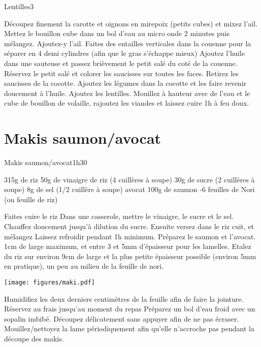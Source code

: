 {\begin{recette}{Lentilles}{3}{}{}
\begin{preparation}
\etape Découpez finement la carotte et oignons en mirepoix (petits cubes) et mixez l'ail.
\etape Mettez le bouillon cube dans un bol d'eau au micro onde 2 minutes puis mélangez. Ajoutez-y l'ail.
\etape Faites des entailles verticales dans la couenne pour la séparer en 4 demi cylindres (afin que le gras s'échappe mieux)
\etape Ajoutez l'huile dans une sauteuse et passez brièvement le petit salé du coté de la couenne.
\etape Réservez le petit salé et colorer les saucisses sur toutes les faces.
\etape Retirez les saucisses de la cocotte.
\etape Ajoutez les légumes dans la cocotte et les faire revenir doucement à l'huile.
\etape Ajoutez les lentilles. Mouillez à hauteur avec de l'eau et le cube de bouillon de volaille, rajoutez les viandes et 
laissez cuire 1h à feu doux.
\end{preparation}
\end{recette}

\section{Makis saumon/avocat}
\begin{recette}{Makis saumon/avocat}{}{1h30}{}
\begin{ingredients}
\ingredient 315g de riz %
\ingredient 50g de vinaigre de riz (4 cuillères à soupe)
\ingredient 30g de sucre (2 cuillères à soupe)
\ingredient 8g de sel (1/2 cuillère à soupe)
 avocat
\ingredient 100g de saumon
-6 feuilles de Nori (ou feuille de riz)
\end{ingredients}

\begin{preparation}
\etape Faites cuire le riz
\etape Dans une casserole, mettre le vinaigre, le sucre et le sel. Chauffez doucement jusqu'à dilution du sucre.
\etape Ensuite versez dans le riz cuit, et mélangez
\etape Laissez refroidir pendant 1h minimum.
\etape Préparez le saumon et l'avocat. 1cm de large maximum, et entre 3 et 5mm d'épaisseur pour les lamelles. 
\etape Etalez du riz sur environ 9cm de large et la plus petite épaisseur possible (environ 5mm en pratique), un peu au milieu de la feuille de nori. 
\begin{center}
\texttt{[image: figures/maki.pdf]}
\end{center}
\etape Humidifiez les deux derniers centimètres de la feuille afin de faire la jointure.
\etape Réservez au frais jusqu'au moment du repas
\etape Préparez un bol d'eau froid avec un sopalin imbibé. Découpez délicatement sans appuyer afin de ne pas écraser. Mouillez/nettoyez la lame périodiquement afin qu'elle n'accroche pas pendant la découpe des makis.  
\end{preparation}
\end{recette}

}
